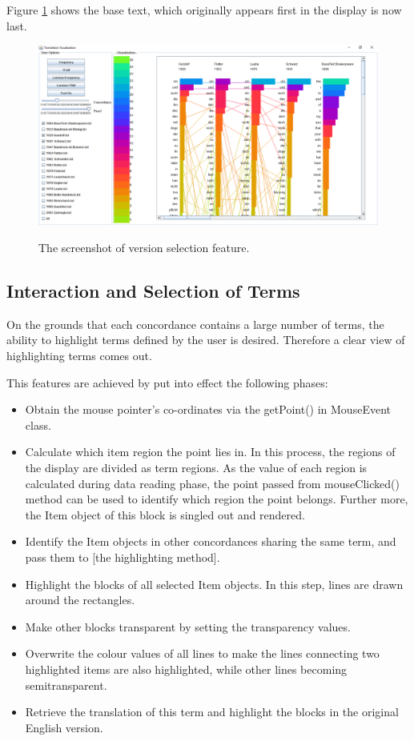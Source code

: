 Figure \ref{fig:versionChoosDemo} shows the base text, which originally appears first in the display is now last.

\begin{figure}[H]
	\centering	
	\includegraphics[width=\textwidth]{Figs/Version-Selecting-Demo}\\[1ex]
	\caption{The screenshot of version selection feature.}
	\label{fig:versionChoosDemo}
\end{figure} 

\subsection{Interaction and Selection of Terms}

On the grounds that each concordance contains a large number of terms, the ability to highlight terms defined by the user is desired. Therefore a clear view of highlighting terms comes out. 

This features are achieved by put into effect the following phases:
\begin{itemize}
	\item \textbf{} Obtain the mouse pointer’s co-ordinates via the getPoint() in MouseEvent class.
	\item \textbf{} Calculate which item region the point lies in. In this process, the regions of the display are divided as term regions. As the value of each region is calculated during data reading phase, the point passed from mouseClicked() method can be used to identify which region the point belongs. Further more, the Item object of this block is singled out and rendered. 
	\item \textbf{} Identify the Item objects in other concordances sharing the same term, and pass them to [the highlighting method].
	\item \textbf{} Highlight the blocks of all selected Item objects. In this step, lines are drawn around the rectangles. 
	\item \textbf{} Make other blocks transparent by setting the transparency values. 
	\item \textbf{} Overwrite the colour values of all lines to make the lines connecting two highlighted items are also highlighted, while other lines becoming semitransparent.
	\item \textbf{} Retrieve the translation of this term and highlight the blocks in the original English version.	
\end{itemize}

